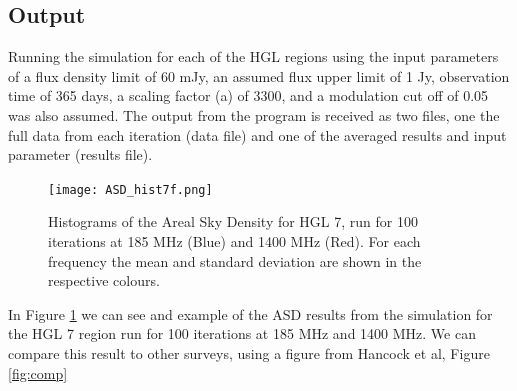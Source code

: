 \documentclass[a4paper, 10pt]{article}
\begin{document}
\subsection{Output}
Running the simulation for each of the HGL regions using the input parameters of a flux density limit of 60 mJy, an assumed flux upper limit of 1 Jy, observation time of 365 days, a scaling factor (a) of 3300, and a modulation cut off of 0.05 was also assumed. The output from the program is received as two files, one the full data from each iteration (data file) and one of the averaged results and input parameter (results file). 
\begin{figure}[H]
\begin{center}
  \texttt{[image: ASD\_hist7f.png]}
  \caption{Histograms of the Areal Sky Density for HGL 7, run for 100 iterations at 185 MHz (Blue) and 1400 MHz (Red). For each frequency the mean and standard deviation are shown in the respective colours.}
  \label{fig:ADS1}
\end{center}
\end{figure}
In Figure \ref{fig:ADS1} we can see and example of the ASD results from the simulation for the HGL 7 region run for 100 iterations at 185 MHz and 1400 MHz. We can compare this result to other surveys, using a figure from Hancock et al, Figure \ref{fig:comp}
\end{document}
